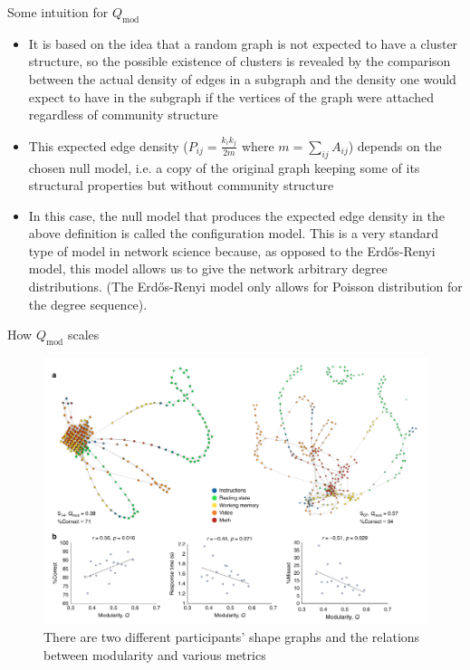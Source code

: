 \documentclass{beamer}
\begin{document}
\begin{frame}{Some intuition for $Q_{\mathrm{mod}}$}
    \begin{itemize}
        \item It is based on the idea that a random graph is not expected to have a cluster structure, so the possible existence of clusters is revealed by the comparison between the actual density of edges in a subgraph and the density one would expect to have in the subgraph if the vertices of the graph
        were attached regardless of community structure\cite{originalcommunity}
        \item This expected edge density ($P_{ij} = \frac{k_ik_j}{2m}$ where $m = \sum_{ij}A_{ij}$) depends on the chosen null model, i.e. a copy of the original graph keeping some of its structural properties but without community structure\cite{community}\pause
        \item In this case, the null model that produces the expected edge density in the above definition is called the configuration model\cite{configurationmodel}. This is a very standard type of model in network science because, as opposed to the Erd\H{o}s-Renyi model, this model allows us to give the network arbitrary degree distributions. (The Erd\H{o}s-Renyi model only allows for Poisson distribution for the degree sequence).
    \end{itemize}
\end{frame}

\begin{frame}{How $Q_{\mathrm{mod}}$ scales}
    \begin{figure}
        \includegraphics[width = 0.75\linewidth]{fig3.png}
        \caption{There are two different participants' shape graphs and the relations between modularity and various metrics}
    \end{figure}
\end{frame}
\end{document}
